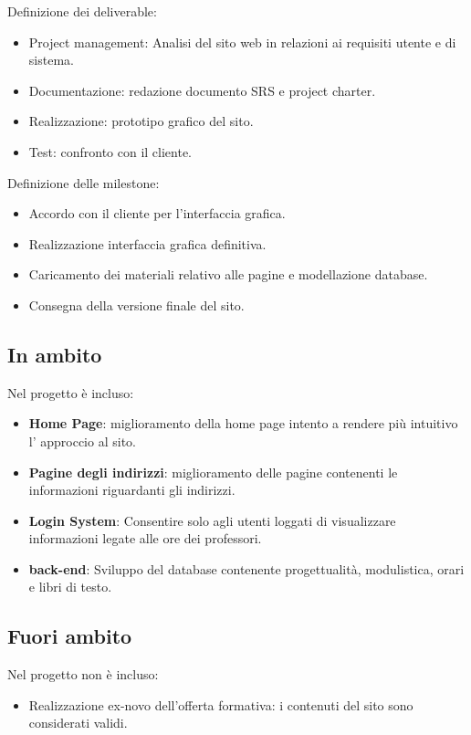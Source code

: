 \documentclass{article}
\begin{document}
	\begin{flushleft}
		Definizione dei deliverable:
		\begin{itemize}
			\item Project management: Analisi del sito web in relazioni ai requisiti utente e di sistema.
			\item Documentazione: redazione documento SRS e project charter.
			\item Realizzazione: prototipo grafico del sito.
			\item Test: confronto con il cliente.
		\end{itemize}
		
		Definizione delle milestone:
		\begin{itemize}
			\item Accordo con il cliente per l'interfaccia grafica.
			\item Realizzazione interfaccia grafica definitiva.
			\item Caricamento dei materiali relativo alle pagine e modellazione database.
			\item Consegna della versione finale del sito.
		\end{itemize}
		\subsection{In ambito}
		Nel progetto è incluso:\\
	    \begin{itemize}
			\item \textbf{Home Page}: miglioramento della home page intento a rendere più intuitivo l' approccio al sito. 
			\item \textbf{Pagine degli indirizzi}: miglioramento delle pagine contenenti le informazioni riguardanti gli indirizzi.
			\item \textbf{Login System}: Consentire solo agli utenti loggati di visualizzare informazioni legate alle ore dei professori.
			\item \textbf{back-end}: Sviluppo del database contenente progettualità, modulistica, orari e libri di testo.
		\end{itemize}
		\subsection{Fuori ambito}
		Nel progetto non è incluso:
		\begin{itemize}
			\item Realizzazione ex-novo dell'offerta formativa: i contenuti del sito sono considerati validi.
		\end{itemize}
		\vspace{2mm}

\end{flushleft}
\end{document}
